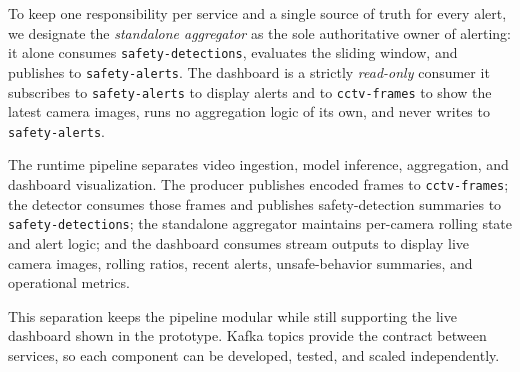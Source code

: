 \documentclass[conference]{IEEEtran}
\begin{document}
To keep one responsibility per service and a single source of truth for every
alert, we designate the \emph{standalone aggregator} as the sole authoritative
owner of alerting: it alone consumes \texttt{safety-detections}, evaluates the
sliding window, and publishes to \texttt{safety-alerts}. The dashboard is a
strictly \emph{read-only} consumer it subscribes to \texttt{safety-alerts} to
display alerts and to \texttt{cctv-frames} to show the latest camera images, runs
no aggregation logic of its own, and never writes to \texttt{safety-alerts}.


The runtime pipeline separates video ingestion, model inference, aggregation,
and dashboard visualization. The producer publishes encoded frames to
\texttt{cctv-frames}; the detector consumes those frames and publishes
safety-detection summaries to \texttt{safety-detections}; the standalone
aggregator maintains per-camera rolling state and alert logic; and the dashboard
consumes stream outputs to display live camera images, rolling ratios, recent
alerts, unsafe-behavior summaries, and operational metrics.

This separation keeps the pipeline modular while still supporting the live
dashboard shown in the prototype. Kafka topics provide the contract between
services, so each component can be developed, tested, and scaled independently.
\end{document}
